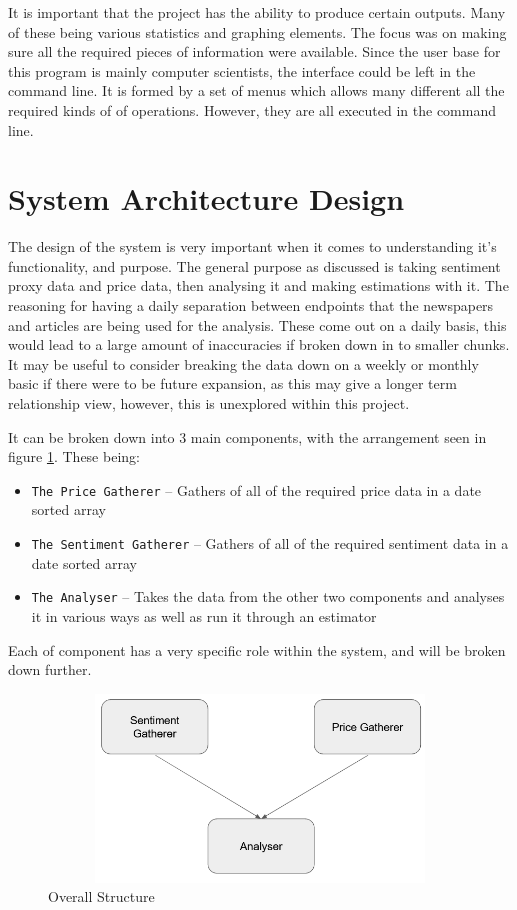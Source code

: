 It is important that the project has the ability to produce certain outputs. Many of these being various statistics and graphing elements. The focus was on making sure all the required pieces of information were available. Since the user base for this program is mainly computer scientists, the interface could be left in the command line. It is formed by a set of menus which allows many different all the required kinds of of operations. However, they are all executed in the command line.

\section{System Architecture Design}

The design of the system is very important when it comes to understanding it's functionality, and purpose. The general purpose as discussed is taking sentiment proxy data and price data, then analysing it and making estimations with it. The reasoning for having a daily separation between endpoints that the newspapers and articles are being used for the analysis. These come out on a daily basis, this would lead to a large amount of inaccuracies if broken down in to smaller chunks. It may be useful to consider breaking the data down on a weekly or monthly basic if there were to be future expansion, as this may give a longer term relationship view, however, this is unexplored within this project.

It can be broken down into 3 main components, with the arrangement seen in figure \ref{fig:overallstructure}. These being:
\begin{itemize}
    \item \texttt{The Price Gatherer} -- Gathers of all of the required price data in a date sorted array
    \item \texttt{The Sentiment Gatherer} -- Gathers of all of the required sentiment data in a date sorted array
    \item \texttt{The Analyser} -- Takes the data from the other two components and analyses it in various ways as well as run it through an estimator
\end{itemize}
Each of component has a very specific role within the system, and will be broken down further.
\begin{figure}[h!]
    \centering
    \includegraphics[width=15cm,height=5cm,keepaspectratio]{design/OverallStructure.png}
    \caption{Overall Structure}
    \label{fig:overallstructure}
\end{figure}

